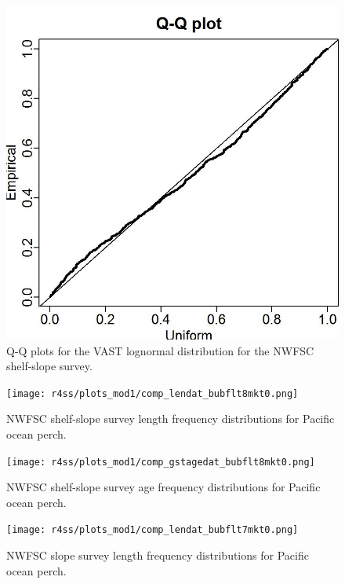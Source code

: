 \documentclass[12pt,]{article}
\begin{document}
\begin{figure}
\centering
\includegraphics{Figures/Q-Q_plot_combo.jpg}
\caption{Q-Q plots for the VAST lognormal distribution for the NWFSC
shelf-slope survey. \label{fig:nw_qq}}
\end{figure}

\FloatBarrier

\begin{figure}
\centering
\texttt{[image: r4ss/plots\_mod1/comp\_lendat\_bubflt8mkt0.png]}
\caption{NWFSC shelf-slope survey length frequency distributions for
Pacific ocean perch. \label{fig:nw_Length}}
\end{figure}

\FloatBarrier

\begin{figure}
\centering
\texttt{[image: r4ss/plots\_mod1/comp\_gstagedat\_bubflt8mkt0.png]}
\caption{NWFSC shelf-slope survey age frequency distributions for
Pacific ocean perch. \label{fig:nw_Age}}
\end{figure}

\FloatBarrier

\begin{figure}
\centering
\texttt{[image: r4ss/plots\_mod1/comp\_lendat\_bubflt7mkt0.png]}
\caption{NWFSC slope survey length frequency distributions for Pacific
ocean perch. \label{fig:nw_slope_Length}}
\end{figure}
\end{document}
